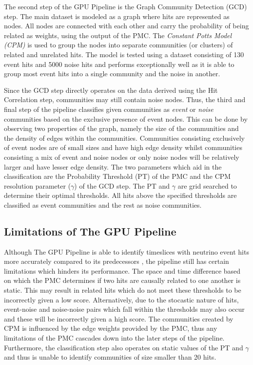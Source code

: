 The second step of the GPU Pipeline is the Graph Community Detection
(GCD) step. The main dataset is modeled as a graph where hits are
represented as nodes. All nodes are connected with each other and
carry the probability of being related as weights, using the output of
the PMC. The \emph{Constant Potts Model (CPM)} \cite{traag2011narrow}
is used to group the nodes into separate communities (or clusters) of
related and unrelated hits. The model is tested using a dataset
consisting of 130 event hits and 5000 noise hits and performs
exceptionally well as it is able to group most event hits into a
single community and the noise in another.

Since the GCD step directly operates on the data derived using the Hit
Correlation step, communities may still contain noise nodes. Thus, the
third and final step of the pipeline classifies given communities as
\emph{event} or \emph{noise} communities based on the exclusive
presence of event nodes. This can be done by observing two properties
of the graph, namely the size of the communities and the density of
edges within the communities. Communities consisting exclusively of
event nodes are of small sizes and have high edge density whilst
communities consisting a mix of event and noise nodes or only noise
nodes will be relatively larger and have lesser edge density. The two
parameters which aid in the classification are the Probability
Threshold (PT) of the PMC and the CPM resolution parameter ($\gamma$)
of the GCD step. The PT and $\gamma$ are grid searched to determine
their optimal thresholds. All hits above the specified thresholds are
classified as event communities and the rest as noise communities.

\subsection{Limitations of The GPU Pipeline}
Although The GPU Pipeline is able to identify timeslices with neutrino
event hits more accurately compared to its predecessors
\cite{karas2019data}, the pipeline still has certain limitations which
hinders its performance. The space and time difference based on which
the PMC determines if two hits are causally related to one another is
static. This may result in related hits which do not meet these
thresholds to be incorrectly given a low score. Alternatively, due to
the stocastic nature of hits, event-noise and noise-noise pairs which
fall within the thresholds may also occur and these will be
incorrectly given a high score. The communities created by CPM is
influenced by the edge weights provided by the PMC, thus any
limitations of the PMC cascades down into the later steps of the
pipeline. Furthermore, the classification step also operates on static
values of the PT and $\gamma$ and thus is unable to identify
communities of size smaller than 20 hits.

